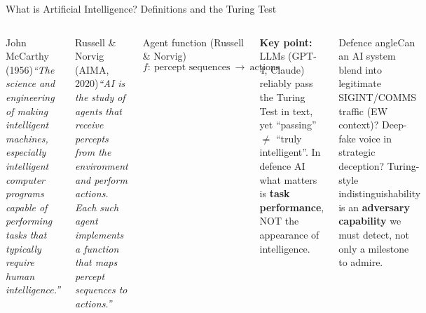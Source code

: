 \documentclass[aspectratio=169,10pt,t]{beamer}
\begin{document}
\begin{frame}{What is Artificial Intelligence? Definitions and the Turing Test}
\begin{columns}[T]
\begin{cbox}[ISSAnavy]{John McCarthy (1956)}\scriptsize\textit{``The science and engineering of making intelligent machines, especially intelligent computer programs capable of performing tasks that typically require human intelligence.''}\end{cbox}
\begin{cbox}[ISSAblue]{Russell \& Norvig (AIMA, 2020)}\scriptsize\textit{``AI is the study of agents that receive percepts from the environment and perform actions. Each such agent implements a function that maps percept sequences to actions.''}\end{cbox}
\begin{fbx}{Agent function (Russell \& Norvig)}\[f:\ \text{percept sequences}\ \longrightarrow\ \text{actions}\]\end{fbx}
\begin{ibox}\scriptsize\textbf{Key point:} LLMs (GPT-4, Claude) reliably pass the Turing Test in text, yet ``passing'' $\neq$ ``truly intelligent''. In defence AI what matters is \textbf{task performance}, NOT the appearance of intelligence.\end{ibox}
\begin{cbox}[ISSAred]{Defence angle}\scriptsize Can an AI system blend into legitimate SIGINT/COMMS traffic (EW context)? Deep-fake voice in strategic deception? Turing-style indistinguishability is an \textbf{adversary capability} we must detect, not only a milestone to admire.\end{cbox}
\end{columns}
\end{frame}
\end{document}
